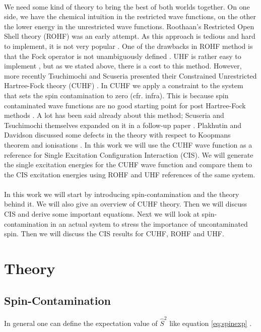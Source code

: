 \paragraph*{}
We need some kind of theory to bring the best of both worlds together. On one side, we have the chemical intuition in the restricted wave functions, on the other the lower
energy in the unrestricted wave functions. Roothaan's Restricted Open Shell theory (ROHF) \cite{Roothaan1960} was an early attempt. As this approach is tedious and hard to implement,
it is not very popular \cite{Scuseria2010, Bally2008}. One of the drawbacks in ROHF method is that the Fock operator is not unambiguously defined \cite{Scuseria2010, Plakhutin2014}.
UHF is rather easy to implement  \cite{Scuseria2010, Bally2008}, but as we stated above, there is a cost to this method.
However, more recently Tsuchimochi and Scuseria presented their Constrained Unrestricted Hartree-Fock theory (CUHF)
 \cite{Scuseria2010}. In CUHF we apply a constraint to the system that sets the spin contamination to zero (cfr. infra). This is because spin contaminated wave functions are no
good starting point for post Hartree-Fock methods \cite{Scuseria2010}. A lot has been said
already about this method; Scuseria and Tsuchimochi themselves expanded on it in a follow-up paper \cite{Scuseria2011}. Plakhutin and Davidson discussed some defects in the theory
with respect to
Koopmans theorem and ionisations \cite{Plakhutin2014}. In this work we will use the CUHF wave function as a reference for
Single Excitation Configuration Interaction (CIS). We will generate the single excitation energies for the CUHF wave function and compare them to the CIS excitation energies using
ROHF and UHF references of the same system.
\paragraph*{}
In this work we will start by introducing spin-contamination and the theory behind it. We will also give an overview of CUHF theory. Then we will discuss CIS and derive some important
equations. Next we will look at spin-contamination in an actual system to stress the importance of uncontaminated spin. Then we will discuss the CIS results for CUHF, ROHF and UHF.
\section{Theory}
\subsection{Spin-Contamination}
\label{subsec:spinconttheory}
In general one can define the expectation value of $\hat{S}^2$ like equation \eqref{eq:spinexp} \cite{Andrews1991}.

